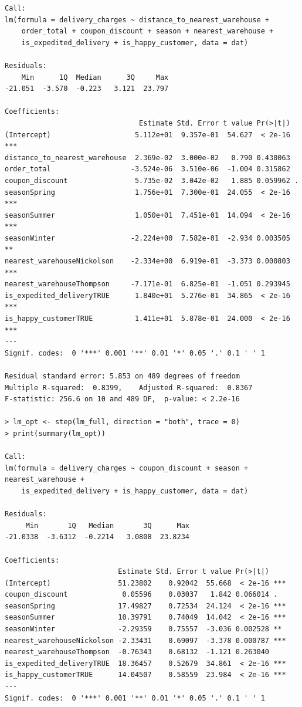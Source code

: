 \documentclass[12pt, a4paper]{article}
\begin{document}
\begin{lstlisting}
Call:
lm(formula = delivery_charges ~ distance_to_nearest_warehouse + 
    order_total + coupon_discount + season + nearest_warehouse + 
    is_expedited_delivery + is_happy_customer, data = dat)

Residuals:
    Min      1Q  Median      3Q     Max 
-21.051  -3.570  -0.223   3.121  23.797 

Coefficients:
                                Estimate Std. Error t value Pr(>|t|)    
(Intercept)                    5.112e+01  9.357e-01  54.627  < 2e-16 ***
distance_to_nearest_warehouse  2.369e-02  3.000e-02   0.790 0.430063    
order_total                   -3.524e-06  3.510e-06  -1.004 0.315862    
coupon_discount                5.735e-02  3.042e-02   1.885 0.059962 .  
seasonSpring                   1.756e+01  7.300e-01  24.055  < 2e-16 ***
seasonSummer                   1.050e+01  7.451e-01  14.094  < 2e-16 ***
seasonWinter                  -2.224e+00  7.582e-01  -2.934 0.003505 ** 
nearest_warehouseNickolson    -2.334e+00  6.919e-01  -3.373 0.000803 ***
nearest_warehouseThompson     -7.171e-01  6.825e-01  -1.051 0.293945    
is_expedited_deliveryTRUE      1.840e+01  5.276e-01  34.865  < 2e-16 ***
is_happy_customerTRUE          1.411e+01  5.878e-01  24.000  < 2e-16 ***
---
Signif. codes:  0 '***' 0.001 '**' 0.01 '*' 0.05 '.' 0.1 ' ' 1

Residual standard error: 5.853 on 489 degrees of freedom
Multiple R-squared:  0.8399,	Adjusted R-squared:  0.8367 
F-statistic: 256.6 on 10 and 489 DF,  p-value: < 2.2e-16

> lm_opt <- step(lm_full, direction = "both", trace = 0)   
> print(summary(lm_opt))

Call:
lm(formula = delivery_charges ~ coupon_discount + season + nearest_warehouse + 
    is_expedited_delivery + is_happy_customer, data = dat)

Residuals:
     Min       1Q   Median       3Q      Max 
-21.0338  -3.6312  -0.2214   3.0808  23.8234 

Coefficients:
                           Estimate Std. Error t value Pr(>|t|)    
(Intercept)                51.23802    0.92042  55.668  < 2e-16 ***
coupon_discount             0.05596    0.03037   1.842 0.066014 .  
seasonSpring               17.49827    0.72534  24.124  < 2e-16 ***
seasonSummer               10.39791    0.74049  14.042  < 2e-16 ***
seasonWinter               -2.29359    0.75557  -3.036 0.002528 ** 
nearest_warehouseNickolson -2.33431    0.69097  -3.378 0.000787 ***
nearest_warehouseThompson  -0.76343    0.68132  -1.121 0.263040    
is_expedited_deliveryTRUE  18.36457    0.52679  34.861  < 2e-16 ***
is_happy_customerTRUE      14.04507    0.58559  23.984  < 2e-16 ***
---
Signif. codes:  0 '***' 0.001 '**' 0.01 '*' 0.05 '.' 0.1 ' ' 1


\end{lstlisting}
\end{document}
